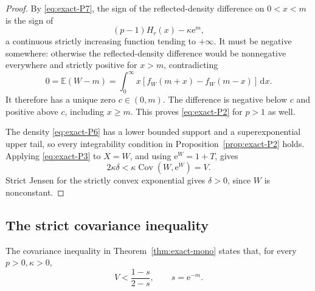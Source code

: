 \begin{proof}
By \eqref{eq:exact-P7}, the sign of the reflected-density difference on \(0<x<m\) is the sign of
\begin{equation}
 (p-1)H_r(x)-\kappa \mathrm{e}^m,
\end{equation}
a continuous strictly increasing function tending to \(+\infty\). It must be negative somewhere: otherwise the reflected-density difference would be nonnegative everywhere and strictly positive for \(x>m\), contradicting
\begin{equation}
 0=\mathbb{E}(W-m)=\int_0^\infty x[f_W(m+x)-f_W(m-x)]\,\mathrm{d}x.
\end{equation}
It therefore has a unique zero \(c\in(0,m)\). The difference is negative below \(c\) and positive above \(c\), including \(x\ge m\). This proves \eqref{eq:exact-P2} for \(p>1\) as well.

The density \eqref{eq:exact-P6} has a lower bounded support and a superexponential upper tail, so every integrability condition in Proposition~\ref{prop:exact-P2} holds. Applying \eqref{eq:exact-P3} to \(X=W\), and using \(\mathrm{e}^W=1+T\), gives
\begin{equation}
 2\kappa\delta<\kappa\operatorname{Cov}(W,\mathrm{e}^W)=V.
\end{equation}
Strict Jensen for the strictly convex exponential gives \(\delta>0\), since \(W\) is nonconstant. \end{proof}

\subsection{The strict covariance inequality}

\noindent The covariance inequality in Theorem~\ref{thm:exact-mono} states that, for every \(p>0,\kappa>0\),
\begin{equation}
 V<\frac{1-s}{2-s},\qquad s=\mathrm{e}^{-m}. \label{eq:exact-P9}
\end{equation}

